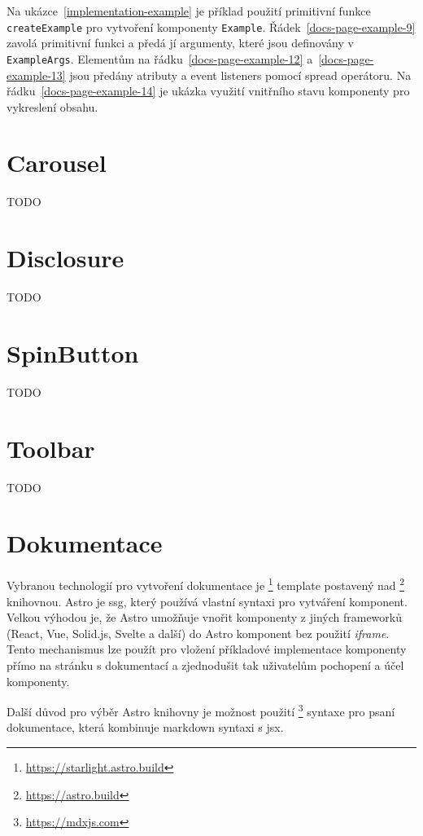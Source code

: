 Na ukázce~\ref{implementation-example} je příklad použití primitivní funkce \texttt{createExample} pro vytvoření komponenty \texttt{Example}.
Řádek~\ref{docs-page-example-9} zavolá primitivní funkci a předá jí argumenty, které jsou definovány v \texttt{ExampleArgs}.
Elementům na řádku~\ref{docs-page-example-12} a~\ref{docs-page-example-13} jsou předány atributy a event listeners pomocí spread operátoru.
Na řádku~\ref{docs-page-example-14} je ukázka využití vnitřního stavu komponenty pro vykreslení obsahu.

\section{Carousel}

TODO

\section{Disclosure}

TODO

\section{SpinButton}

TODO

\section{Toolbar}

TODO

\clearpage

\section{Dokumentace}

Vybranou technologií pro vytvoření dokumentace je \footnote{\url{https://starlight.astro.build}} template postavený nad \footnote{\url{https://astro.build}} knihovnou.
Astro je \gls{ssg}, který používá vlastní syntaxi pro vytváření komponent.
Velkou výhodou je, že Astro umožňuje vnořit komponenty z jiných frameworků (React, Vue, Solid.js, Svelte a další) do Astro komponent bez použití \textit{iframe}.
Tento mechanismus lze použít pro vložení příkladové implementace komponenty přímo na stránku s dokumentací a zjednodušit tak uživatelům pochopení a účel komponenty.

Další důvod pro výběr Astro knihovny je možnost použití \footnote{\url{https://mdxjs.com}} syntaxe pro psaní dokumentace, která kombinuje markdown syntaxi s \gls{jsx}.

